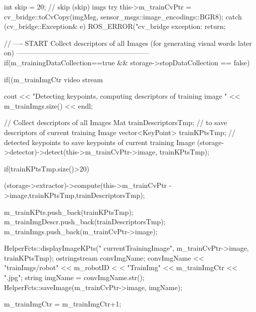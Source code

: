 \begin{DoxyCode}
                                                                               
                                                         {

        int skip = 20; // skip (skip) imgs
        try     {
                this->m_trainCvPtr = cv_bridge::toCvCopy(imgMsg, 
      sensor_msgs::image_encodings::BGR8);
        }
        catch (cv_bridge::Exception& e) {
                ROS_ERROR("cv_bridge exception: %
                return;
        }

        
        // ---- START Collect descriptors of all Images (for generating visual
       words later on) ---------------------------------------------------------                
        if(m_trainingDataCollection==true && storage->stopDataCollection == 
      false)
        {

                if((m_trainImgCtr %
       video stream
                {
        
                        cout << "Detecting keypoints, computing descriptors of
       training image " << m_trainImgs.size() << endl;

                        // Collect descriptors of all Images
                        Mat trainDescriptorsTmp; // to save descriptors of
       current training Image
                        vector<KeyPoint> trainKPtsTmp; // detected keypoints to
       save keypoints of current training Image
                        (storage->detector)->detect(this->m_trainCvPtr->image,
      trainKPtsTmp);

                        if(trainKPtsTmp.size()>20) {

                                (storage->extractor)->compute(this->m_trainCvPtr
      ->image,trainKPtsTmp,trainDescriptorsTmp);

                                m_trainKPts.push_back(trainKPtsTmp);
                                m_trainImgDescr.push_back(trainDescriptorsTmp);
                                m_trainImgs.push_back(m_trainCvPtr->image);


                                HelperFcts::displayImageKPts("
      currentTrainingImage", m_trainCvPtr->image, trainKPtsTmp);
                                ostringstream convImgName;
                                convImgName << "trainImgs/robot" << m_robotID <
      < "TrainImg" << m_trainImgCtr << ".jpg";
                                string imgName = convImgName.str();
                                HelperFcts::saveImage(m_trainCvPtr->image, 
      imgName);
                        }
                }
                m_trainImgCtr = m_trainImgCtr+1;
        }

}
\end{DoxyCode}
